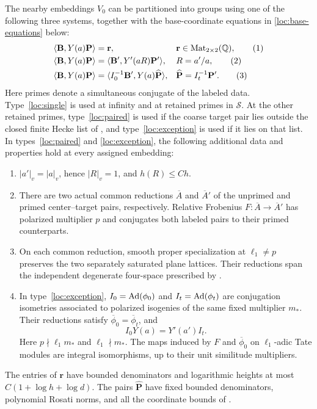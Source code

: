 \begin{proposition}\label{loc:equations}
The nearby embeddings $V_0$ can be partitioned into groups using one of
the following three systems, together with the base-coordinate
equations in \eqref{loc:base-equations} below:
\begin{align}
 \langle\mathbf B,Y(a)\mathbf P\rangle
   &=\mathbf r,
   &&\mathbf r\in\operatorname{Mat}_{2\times2}(\mathbb Q),
   \label{loc:single}\tag{1}\\
 \langle\mathbf B,Y(a)\mathbf P\rangle
   &=\langle\mathbf B',Y'(aR)\mathbf P'\rangle,
   &&R=a'/a,
   \label{loc:paired}\tag{2}\\
 \langle\mathbf B,Y(a)\mathbf P\rangle
   &=\langle I_0^{-1}\mathbf B',Y(a)\widehat{\mathbf P}\rangle,
   &&\widehat{\mathbf P}=I_t^{-1}\mathbf P'.
   \label{loc:exception}\tag{3}
\end{align}
Here primes denote a simultaneous conjugate of the labeled data.
Type~\eqref{loc:single} is used at infinity and at retained primes in
$\mathcal S$.  At the other retained primes, type~\eqref{loc:paired}
is used if the coarse target pair lies outside the closed finite
Hecke list of , and type~\eqref{loc:exception}
is used if it lies on that list.  In types~\eqref{loc:paired} and
\eqref{loc:exception}, the following additional data and properties
hold at every assigned embedding:
\begin{enumerate}[label=(\roman*)]
\item $|a'|_v=|a|_v$, hence $|R|_v=1$, and $h(R)\leq Ch$.
\item There are two actual common reductions $\overline A$ and
$\overline A'$ of the unprimed and primed center--target pairs,
respectively.  Relative Frobenius
$F:\overline A\longrightarrow\overline A'$ has polarized multiplier
$p$ and conjugates both labeled pairs to their primed counterparts.
\item On each common reduction, smooth proper specialization at
$\ell_1\ne p$ preserves the two separately saturated plane lattices.
Their reductions span the independent degenerate four-space prescribed
by .
\item In type~\eqref{loc:exception}, $I_0=\operatorname{Ad}(\phi_0)$ and
$I_t=\operatorname{Ad}(\phi_t)$ are conjugation isometries associated to polarized
isogenies of the same fixed multiplier $m_*$.  Their reductions satisfy
$\overline\phi_0=\overline\phi_t$, and
\begin{equation}\label{loc:transport-square}
 I_0Y(a)=Y'(a')I_t.
\end{equation}
Here $p\nmid\ell_1m_*$ and $\ell_1\nmid m_*$.  The maps induced by
$F$ and $\overline\phi_0$ on $\ell_1$-adic Tate modules are integral
isomorphisms, up to their unit similitude multipliers.
\end{enumerate}
The entries of $\mathbf r$ have bounded denominators and logarithmic
heights at most $C(1+\log h+\log d)$.  The pairs
$\widehat{\mathbf P}$ have fixed bounded denominators, polynomial
Rosati norms, and all the coordinate bounds of .
\end{proposition}

